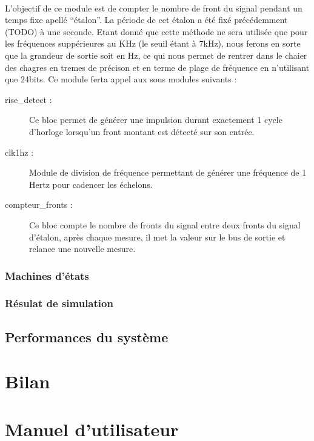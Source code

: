 \documentclass[a4paper,11pt]{article}
\begin{document}
\paragraph{} L'objectif de ce module est de compter le nombre de front du signal pendant un temps fixe apellé ``étalon''.
La période de cet étalon a été fixé précédemment (TODO) à une seconde. Etant donné que cette méthode ne sera utilisée que pour les 
fréquences suppérieures au KHz (le seuil étant à 7kHz), nous ferons en sorte que la grandeur de sortie soit en Hz, ce qui nous permet 
de rentrer dans le chaier des chagres en tremes de précison et en terme de plage de fréquence en n'utilisant que 24bits. Ce module 
ferta appel aux sous modules suivants :

\begin{description}
  \item[rise_detect : ] Ce bloc permet de générer une impulsion durant exactement 1 cycle d'horloge lorsqu'un front montant est détecté
  sur son entrée.
  \item[clk1hz : ] Module de division de fréquence permettant de générer une fréquence de 1 Hertz pour cadencer les échelons.
  \item[compteur_fronts : ] Ce bloc compte le nombre de fronts du signal entre deux fronts du signal d'étalon, après chaque mesure,
  il met la valeur sur le bus de sortie et relance une nouvelle mesure.
\end{description}


  \subsubsection{Machines d'états}
  \subsubsection{Résulat de simulation}

\subsection{Performances du système}



\newpage
\section{Bilan}

\newpage
\appendix
\section{Manuel d'utilisateur}
\end{document}
